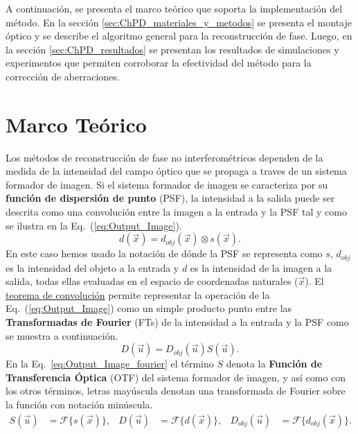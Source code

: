 A continuación, se presenta el marco teórico que
soporta la implementación del método. En la sección
\ref{sec:ChPD_materiales_y_metodos} se presenta el montaje óptico y se
describe el algoritmo general para la reconstrucción de fase. Luego, en
la sección \ref{sec:ChPD_resultados} se presentan los resultados de
simulaciones y experimentos que permiten corroborar la efectividad del
método para la corrección de aberraciones. 

\section{Marco Teórico}
\label{sec:ChPD_marco_teorico}
Los métodos de reconstrucción de fase no interferométricos dependen de
la medida de la intensidad del campo óptico que se
propaga a traves de un sistema formador de imagen. Si el sistema
formador de imagen se
caracteriza por su \textbf{función de dispersión de punto} (\acrshort{PSF}), la intensidad
a la salida puede ser descrita como una convolución entre la imagen a
la entrada y la PSF tal y como se ilustra en la Eq.~(\ref{eq:Output_Image}).
\begin{equation}\label{eq:Output_Image}
d(\vec{x}) = d_{obj}(\vec{x}) \otimes s(\vec{x}).
\end{equation}
En este caso hemos usado la notación de  dónde
la PSF se representa como $s$, $d_{obj}$ es la intensidad del objeto a
la entrada y $d$ es la intensidad de la imagen a la salida, todas
ellas evaluadas en el espacio de coordenadas naturales ($\vec{x}$). El
 \href{http://es.wikipedia.org/wiki/Teorema_de_convolución}{teorema de
   convolución} permite representar la operación de la Eq.~(\ref{eq:Output_Image}) como un simple producto punto entre las
 \textbf{Transformadas de Fourier} (\acrshort{FT}s) de la intensidad a la entrada y la
 PSF como se muestra a continuación. 
\begin{equation}\label{eq:Output_Image_fourier}
D(\vec{u}) = D_{obj}(\vec{u})S(\vec{u}).
\end{equation}
En la Eq.~\ref{eq:Output_Image_fourier} el término $S$ denota la \textbf{Función de
Transferencia Óptica} (\acrshort{OTF}) del sistema formador de imagen, y así como
con los otros términos, letras mayúscula denotan una transformada de
Fourier sobre la función con notación minúscula.
\begin{align*} 
S(\vec{u})&= \mathcal{F}\{ s(\vec{x}) \},&D(\vec{u})&= \mathcal{F}\{ d(\vec{x}) \}, &D_{obj}(\vec{u})&= \mathcal{F}\{ d_{obj}(\vec{x}) \}. 
\end{align*}
